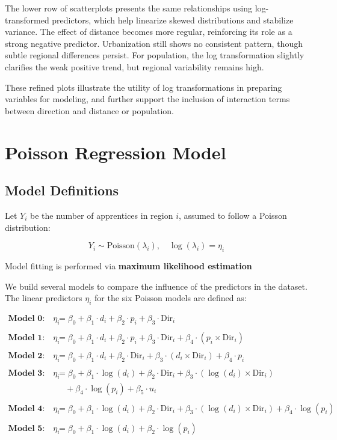 \documentclass[
  12pt,
]{article}
\begin{document}
The lower row of scatterplots presents the same relationships using
log-transformed predictors, which help linearize skewed distributions
and stabilize variance. The effect of distance becomes more regular,
reinforcing its role as a strong negative predictor. Urbanization still
shows no consistent pattern, though subtle regional differences persist.
For population, the log transformation slightly clarifies the weak
positive trend, but regional variability remains high.

These refined plots illustrate the utility of log transformations in
preparing variables for modeling, and further support the inclusion of
interaction terms between direction and distance or population.

\section{Poisson Regression Model}\label{poisson-regression-model}

\subsection{Model Definitions}\label{model-definitions}

Let \(Y_i\) be the number of apprentices in region \(i\), assumed to
follow a Poisson distribution:

\[
Y_i \sim \text{Poisson}(\lambda_i), \quad \log(\lambda_i) = \eta_i
\]

Model fitting is performed via \textbf{maximum likelihood estimation}

We build several models to compare the influence of the predictors in
the dataset. The linear predictors \(\eta_i\) for the six Poisson models
are defined as:

\begin{align*}
\textbf{Model 0:} \quad 
\eta_i &= \beta_0 + \beta_1 \cdot d_i + \beta_2 \cdot p_i + \beta_3 \cdot \text{Dir}_i \\
\\
\textbf{Model 1:} \quad 
\eta_i &= \beta_0 + \beta_1 \cdot d_i + \beta_2 \cdot p_i + \beta_3 \cdot \text{Dir}_i + \beta_4 \cdot (p_i \times \text{Dir}_i) \\
\\
\textbf{Model 2:} \quad 
\eta_i &= \beta_0 + \beta_1 \cdot d_i + \beta_2 \cdot \text{Dir}_i + \beta_3 \cdot (d_i \times \text{Dir}_i) + \beta_4 \cdot p_i \\
\\
\textbf{Model 3:} \quad 
\eta_i &= \beta_0 + \beta_1 \cdot \log(d_i) + \beta_2 \cdot \text{Dir}_i + \beta_3 \cdot (\log(d_i) \times \text{Dir}_i) \\
       &\quad + \beta_4 \cdot \log(p_i) + \beta_5 \cdot u_i \\
\\
\textbf{Model 4:} \quad 
\eta_i &= \beta_0 + \beta_1 \cdot \log(d_i) + \beta_2 \cdot \text{Dir}_i + \beta_3 \cdot (\log(d_i) \times \text{Dir}_i) + \beta_4 \cdot \log(p_i) \\
\\
\textbf{Model 5:} \quad 
\eta_i &= \beta_0 + \beta_1 \cdot \log(d_i) + \beta_2 \cdot \log(p_i)
\end{align*}
\end{document}
